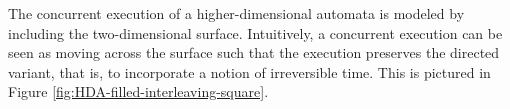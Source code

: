     
    


    The concurrent execution of a higher-dimensional automata is modeled by including the two-dimensional surface. Intuitively, a concurrent execution can be seen as moving across the surface such that the execution preserves the directed variant, that is, to incorporate a notion of irreversible time. This is pictured in Figure \ref{fig:HDA-filled-interleaving-square}. 
    
    
